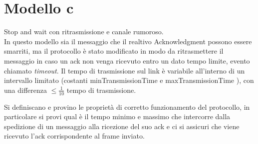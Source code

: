 \documentclass[a4paper]{article}
\begin{document}
\section{Modello c}
Stop and wait con ritrasmissione e canale rumoroso.\\
In questo modello sia il messaggio che il realtivo Acknowledgment possono essere smarriti, ma il protocollo è stato modificato in modo da ritrasmettere il messaggio in caso un ack non venga ricevuto entro un dato tempo limite, evento chiamato \textit{timeout}.
Il tempo di trasmissione sul link è variabile all’interno di un intervallo limitato (costanti minTransmissionTime e maxTransmissionTime ), con una differenza $\leq \frac{1}{10}$ tempo di trasmissione.

Si definiscano e provino le proprietà di corretto funzionamento del protocollo, in particolare si provi qual è il tempo minimo e massimo che intercorre dalla spedizione di un messaggio alla ricezione del suo ack e ci si assicuri che viene ricevuto l'ack corrispondente al frame inviato.
\end{document}
